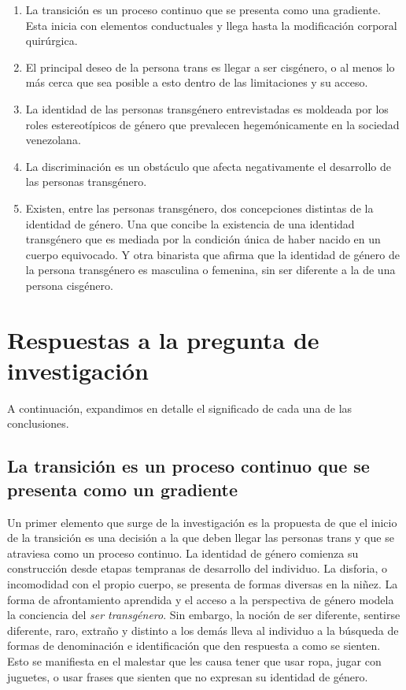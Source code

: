 \begin{enumerate}

  \item La transición es un proceso continuo que se presenta como una gradiente.
  Esta inicia con elementos conductuales y llega hasta la modificación corporal
  quirúrgica.

  \item El principal deseo de la persona trans es llegar a ser cisgénero, o al
  menos lo más cerca que sea posible a esto dentro de las limitaciones y su
  acceso.

  \item La identidad de las personas transgénero entrevistadas es moldeada por los
  roles estereotípicos de género que prevalecen hegemónicamente en la sociedad
  venezolana.

  \item La discriminación es un obstáculo que afecta negativamente el desarrollo
  de las personas transgénero.

  \item Existen, entre las personas transgénero, dos concepciones distintas de
  la identidad de género. Una que concibe la existencia de una identidad
  transgénero que es mediada por la condición única de haber nacido en un
  cuerpo equivocado. Y otra binarista que afirma que la identidad de género de
  la persona transgénero es masculina o femenina, sin ser diferente a la de una
  persona cisgénero.

\end{enumerate}

\section{Respuestas a la pregunta de investigación}


A continuación, expandimos en detalle el significado de cada una de las
conclusiones.

\subsection[La transición es un proceso continuo]{La transición es un proceso continuo que se presenta como un gradiente}

Un primer elemento que surge de la investigación es la propuesta de que el
inicio de la transición es una decisión a la que deben llegar las personas trans
y que se atraviesa como un proceso continuo. La identidad de género comienza su
construcción desde etapas tempranas de desarrollo del individuo. La disforia, o
incomodidad con el propio cuerpo, se presenta de formas diversas en la niñez. La
forma de afrontamiento aprendida y el acceso a la perspectiva de género modela
la conciencia del \emph{ser transgénero}. Sin embargo, la noción de ser
diferente, sentirse diferente, raro, extraño y distinto a los demás lleva al
individuo a la búsqueda de formas de denominación e identificación que den
respuesta a como se sienten. Esto se manifiesta en el malestar que les causa
tener que usar ropa, jugar con juguetes, o usar frases que sienten que no expresan
su identidad de género.

